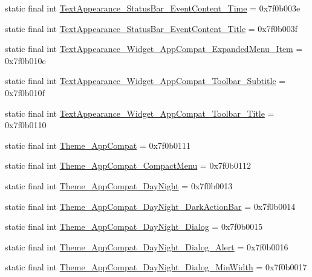 \begin{CompactItemize}
\item 
static final int \hyperlink{classandroid_1_1support_1_1v7_1_1appcompat_1_1_r_1_1style_cdc480ee842fd272d71391b9b34170d2}{TextAppearance\_\-StatusBar\_\-EventContent\_\-Time} = 0x7f0b003e
\item 
static final int \hyperlink{classandroid_1_1support_1_1v7_1_1appcompat_1_1_r_1_1style_5750f9fe3fe6a22f1358597d7cd2f1bb}{TextAppearance\_\-StatusBar\_\-EventContent\_\-Title} = 0x7f0b003f
\item 
static final int \hyperlink{classandroid_1_1support_1_1v7_1_1appcompat_1_1_r_1_1style_6365af88eef08cf765bcc26e6de77216}{TextAppearance\_\-Widget\_\-AppCompat\_\-ExpandedMenu\_\-Item} = 0x7f0b010e
\item 
static final int \hyperlink{classandroid_1_1support_1_1v7_1_1appcompat_1_1_r_1_1style_8b034b68d07abe7884ea627e1474a846}{TextAppearance\_\-Widget\_\-AppCompat\_\-Toolbar\_\-Subtitle} = 0x7f0b010f
\item 
static final int \hyperlink{classandroid_1_1support_1_1v7_1_1appcompat_1_1_r_1_1style_471b484ce3cf9fc4dae71295a2e996f0}{TextAppearance\_\-Widget\_\-AppCompat\_\-Toolbar\_\-Title} = 0x7f0b0110
\item 
static final int \hyperlink{classandroid_1_1support_1_1v7_1_1appcompat_1_1_r_1_1style_b0758c2ae4f72d74243d896ee1f441dd}{Theme\_\-AppCompat} = 0x7f0b0111
\item 
static final int \hyperlink{classandroid_1_1support_1_1v7_1_1appcompat_1_1_r_1_1style_9313a844f5e7b49c7c8d54b6c0628ac9}{Theme\_\-AppCompat\_\-CompactMenu} = 0x7f0b0112
\item 
static final int \hyperlink{classandroid_1_1support_1_1v7_1_1appcompat_1_1_r_1_1style_b337cd3de1c7f616f6782430c52f3de7}{Theme\_\-AppCompat\_\-DayNight} = 0x7f0b0013
\item 
static final int \hyperlink{classandroid_1_1support_1_1v7_1_1appcompat_1_1_r_1_1style_5452375d18b870cf499056868a83ca5d}{Theme\_\-AppCompat\_\-DayNight\_\-DarkActionBar} = 0x7f0b0014
\item 
static final int \hyperlink{classandroid_1_1support_1_1v7_1_1appcompat_1_1_r_1_1style_621422b5343322c7ed7cab76bafdf6fc}{Theme\_\-AppCompat\_\-DayNight\_\-Dialog} = 0x7f0b0015
\item 
static final int \hyperlink{classandroid_1_1support_1_1v7_1_1appcompat_1_1_r_1_1style_aa92083993a616fccb9581c2cad96a27}{Theme\_\-AppCompat\_\-DayNight\_\-Dialog\_\-Alert} = 0x7f0b0016
\item 
static final int \hyperlink{classandroid_1_1support_1_1v7_1_1appcompat_1_1_r_1_1style_be3d3f41b7a81e50298c2a32ebde0c3e}{Theme\_\-AppCompat\_\-DayNight\_\-Dialog\_\-MinWidth} = 0x7f0b0017

\end{CompactItemize}
